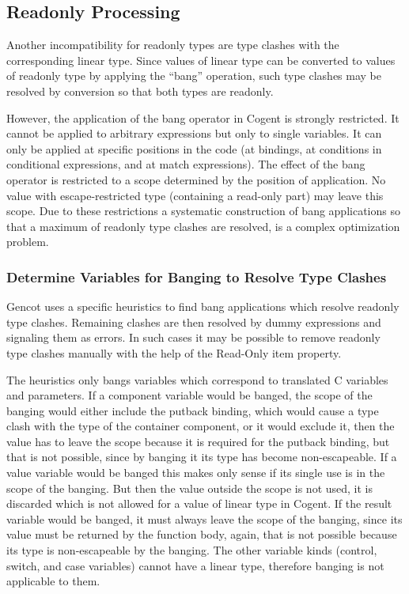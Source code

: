\subsection{Readonly Processing}
\label{impl-post-bang}

Another incompatibility for readonly types are type clashes with the corresponding linear type. Since values of linear type
can be converted to values of readonly type by applying the ``bang'' operation, such type clashes may be resolved by conversion
so that both types are readonly.

However, the application of the bang operator in Cogent is strongly restricted. It cannot be applied to arbitrary expressions
but only to single variables. It can only be applied at specific positions in the code (at bindings, at conditions in conditional
expressions, and at match expressions). The effect of the bang operator is restricted to a scope determined by the position of
application. No value with escape-restricted type (containing a read-only part) may leave this scope. Due to these restrictions
a systematic construction of bang applications so that a maximum of readonly type clashes are resolved, is a complex optimization
problem.

\subsubsection{Determine Variables for Banging to Resolve Type Clashes}

Gencot uses a specific heuristics to find bang applications which resolve readonly type clashes. Remaining clashes are then
resolved by dummy expressions and signaling them as errors. In such cases it may be possible to remove readonly type clashes
manually with the help of the Read-Only item property.

The heuristics only bangs variables which correspond to translated C variables and parameters. If a component variable would
be banged, the scope of the banging would either include the putback binding, which would cause a type clash with the type of
the container component, or it would exclude it, then the value has to leave the scope because it is required for the putback
binding, but that is not possible, since by banging it its type has become non-escapeable. If a value variable would be banged
this makes only sense if its single use is in the scope of the banging. But then the value outside the scope is not used, it
is discarded which is not allowed for a value of linear type in Cogent. If the result variable would be banged, it must always
leave the scope of the banging, since its value must be returned by the function body, again, that is not possible because its
type is non-escapeable by the banging. The other variable kinds (control, switch, and case variables) cannot have a linear
type, therefore banging is not applicable to them.

